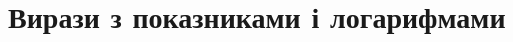 \documentclass{book}
\begin{document}
%
\chapter{Вирази з показниками і логарифмами}

%
\end{document}
